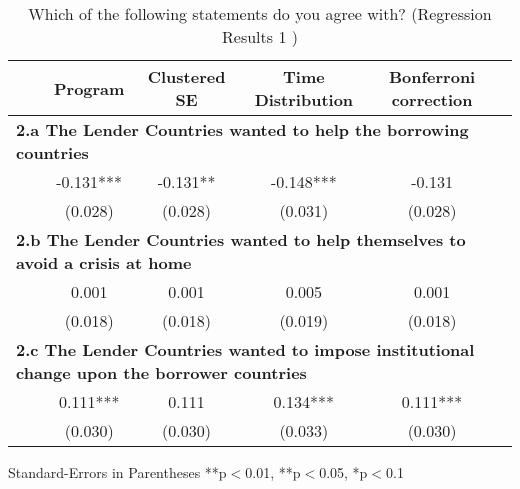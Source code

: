 \documentclass[12pt]{article}
\begin{document}








\begin{table}[h!]

\caption{Which of the following statements do you agree with? (Regression Results 1 )} 
\hskip -2.5cm 
\begin{tabular}{l*{5}{c}}
\hline\hline
\ \  &Program & Clustered SE & Time Distribution & Bonferroni correction \\
\hline
\multicolumn{6}{l}{\textbf{2.a The Lender Countries wanted to help the borrowing countries}} \\
\ \   &-0.131{***}&-0.131{**}&-0.148{***} &-0.131{*** \\ 
&(0.028) & (0.028) & (0.031) & (0.028)  \\ 
\multicolumn{6}{l}{\textbf{2.b The Lender Countries wanted to help themselves to avoid a crisis at home}} \\
\ \  &0.001{}&0.001{}&0.005{}&0.001{} \\ 
&(0.018) & (0.018) & (0.019) & (0.018)   \\
\multicolumn{6}{l}{\textbf{2.c The Lender Countries wanted to impose institutional change upon the borrower countries }} \\
\ \   &0.111{***}&0.111{}&0.134{***} &0.111{***} \\ 
&(0.030) & (0.030) & (0.033) & (0.030) \\
\hline\hline
\end{tabular}
\begin{tablenotes}
\small
\item Standard-Errors in Parentheses \quad  ***p$<$0.01, **p$<$0.05, *p$<$0.1   
\end{tablenotes}
\end{table}
\end{document}
